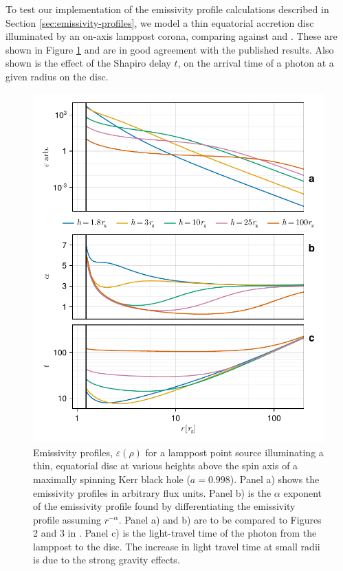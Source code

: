 \documentclass[fleqn,usenatbib]{mnras}
\begin{document}
To test our implementation of the emissivity profile calculations described in
Section \ref{sec:emissivity-profiles}, we model a thin equatorial accretion disc
illuminated by an on-axis lamppost corona, comparing against
\cite{wilkins_understanding_2012} and \cite{dauser_irradiation_2013}. These are
shown in Figure \ref{fig:emissivity-profiles} and are in good agreement with the
published results. Also shown is the effect of the Shapiro delay $t$, on the
arrival time of a photon at a given radius on the disc.

\begin{figure}
    \centering
    \includegraphics[width=0.99\columnwidth]{figures/emissivity.point-source.pdf}
    \caption{Emissivity profiles, $\varepsilon(\rho)$ for a lamppost point
        source illuminating a thin, equatorial disc at various heights above the
        spin axis of a maximally spinning Kerr black hole ($a = 0.998$). Panel
        a) shows the emissivity profiles in arbitrary flux units.  Panel b) is
        the $\alpha$ exponent of the emissivity profile found by differentiating
        the emissivity profile assuming $r^{-\alpha}$. Panel a) and b) are to be
        compared to Figures 2 and 3 in \citet{dauser_irradiation_2013}. Panel c)
        is the light-travel time of the photon from the lamppost to the disc.
        The increase in light travel time at small radii is due to the strong
        gravity effects.
}
    \label{fig:emissivity-profiles}
\end{figure}
\end{document}
